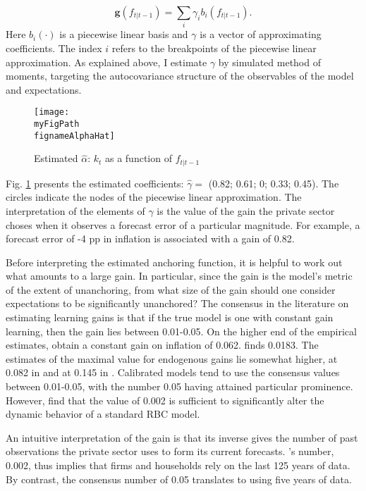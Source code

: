 \documentclass[11pt]{article}
\def \myFigPath {../../figures/}
\renewcommand{\[}{\begin{equation}}
\renewcommand{\]}{\end{equation}}
\def\meanalph{(0.82;    0.61;    0;    0.33;    0.45)}
\def\fignameAlphaHat{alph_opt_N_100_nfe_5_gridspacing_manual_Wdiffs2_100000_Wmid_1000_Nsimulations_command_sigmas_09_Oct_2020_15_08_45}
\begin{document}
\begin{equation}
\mathbf{g}(f_{t|t-1}) = \sum_i \gamma_i b_i(f_{t|t-1})\label{gain}.
\end{equation}
Here $b_i(\cdot)$ is a piecewise linear basis and $\gamma$ is a vector of approximating coefficients. The index $i$ refers to the breakpoints of the piecewise linear approximation. As explained above, I estimate $\gamma$ by simulated method of moments, targeting the autocovariance structure of the observables of the model and expectations.


\begin{figure}[h!]
\texttt{[image: \\myFigPath \\fignameAlphaHat]}
\caption{Estimated $\hat{\alpha}$: $k_t$ as a function of $f_{t|t-1}$}
\label{alpha_hat}
\end{figure}

Fig. \ref{alpha_hat} presents the estimated coefficients: $\hat{\gamma}=$ \meanalph. The circles indicate the nodes of the piecewise linear approximation. The interpretation of the elements of $\hat{\gamma}$ is the value of the gain the private sector choses when it observes a forecast error of a particular magnitude. For example, a forecast error of -4 pp in inflation is associated with a gain of 0.82. 

Before interpreting the estimated anchoring function, it is helpful to work out what amounts to a large gain. In particular, since the gain is the model's metric of the extent of unanchoring, from what size of the gain should one consider expectations to be significantly unanchored? The consensus in the literature on estimating learning gains is that if the true model is one with constant gain learning, then the gain lies between 0.01-0.05. On the higher end of the empirical estimates, \cite{branch2006simple} obtain a constant gain on inflation of 0.062. \cite{milani2007expectations} finds 0.0183. The estimates of the maximal value for endogenous gains lie somewhat higher, at 0.082 in \cite{milani2014learning} and at 0.145 in \cite{carvalho2019anchored}. Calibrated models tend to use the consensus values between 0.01-0.05, with the number 0.05 having attained particular prominence. However, \cite{eusepi2011expectations} find that the value of 0.002 is sufficient to significantly alter the dynamic behavior of a standard RBC model. 

An intuitive interpretation of the gain is that its inverse gives the number of past observations the private sector uses to form its current forecasts.  \cite{eusepi2011expectations}'s number, 0.002, thus implies that firms and households rely on the last 125 years of data. By contrast, the consensus number of 0.05 translates to using five years of data. 
\end{document}
